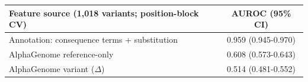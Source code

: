 \begin{tabular}{lc}\toprule
Feature source (1,018 variants; position-block CV) & AUROC (95\% CI)\\\midrule
Annotation: consequence terms + substitution & 0.959 (0.945-0.970)\\
AlphaGenome reference-only & 0.608 (0.573-0.643)\\
AlphaGenome variant ($\Delta$) & 0.514 (0.481-0.552)\\
\bottomrule\end{tabular}
